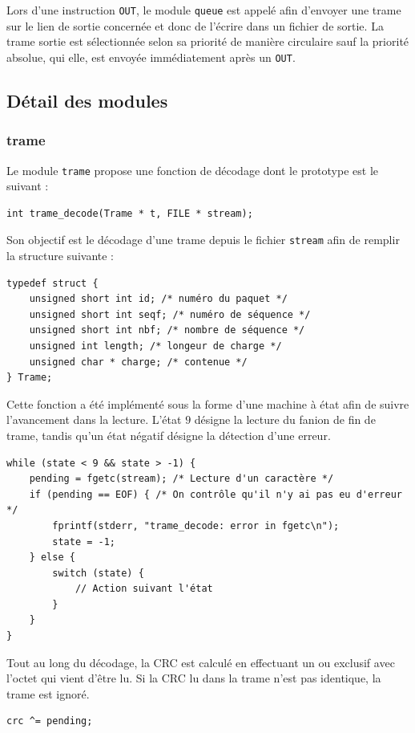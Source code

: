 \documentclass[a4paper,11pt]{article}
\begin{document}
Lors d'une instruction \texttt{OUT}, le module \texttt{queue} est appelé afin d'envoyer une trame sur le lien de sortie concernée et donc de l'écrire dans un fichier de sortie. La trame sortie est sélectionnée selon sa priorité de manière circulaire sauf la priorité absolue, qui elle, est envoyée immédiatement après un \texttt{OUT}.

\subsection{Détail des modules}

\subsubsection{trame}
Le module \texttt{trame} propose une fonction de décodage dont le prototype est le suivant :
\begin{verbatim}
int trame_decode(Trame * t, FILE * stream);
\end{verbatim}
Son objectif est le décodage d'une trame depuis le fichier \texttt{stream} afin de remplir la structure suivante :
\begin{verbatim}
typedef struct {
    unsigned short int id; /* numéro du paquet */
    unsigned short int seqf; /* numéro de séquence */
    unsigned short int nbf; /* nombre de séquence */
    unsigned int length; /* longeur de charge */
    unsigned char * charge; /* contenue */
} Trame;
\end{verbatim}
Cette fonction a été implémenté sous la forme d'une machine à état afin
de suivre l'avancement dans la lecture. L'état $9$ désigne la lecture du
fanion de fin de trame, tandis qu'un état négatif désigne la détection
d'une erreur.
\begin{verbatim}
while (state < 9 && state > -1) {
    pending = fgetc(stream); /* Lecture d'un caractère */
    if (pending == EOF) { /* On contrôle qu'il n'y ai pas eu d'erreur */
        fprintf(stderr, "trame_decode: error in fgetc\n");
        state = -1; 
    } else {
        switch (state) {
            // Action suivant l'état
        }
    }
}
\end{verbatim}
Tout au long du décodage, la CRC est calculé en effectuant un ou exclusif
avec l'octet qui vient d'être lu. Si la CRC lu dans la trame n'est pas
identique, la trame est ignoré.
\begin{verbatim}
crc ^= pending;
\end{verbatim}
\end{document}
